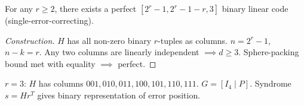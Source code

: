 \begin{theorem}
For any $r \ge 2$, there exists a perfect $[2^r-1, 2^r-1-r, 3]$ binary linear code (single-error-correcting).
\end{theorem}

\begin{proof}[Construction]
$H$ has all non-zero binary $r$-tuples as columns. $n = 2^r-1$, $n-k = r$. Any two columns are linearly independent $\implies d \ge 3$. Sphere-packing bound met with equality $\implies$ perfect.
\end{proof}

\begin{example}
$r=3$: $H$ has columns $001, 010, 011, 100, 101, 110, 111$. $G = [I_4 \mid P]$. Syndrome $s = H r^T$ gives binary representation of error position.
\end{example}

